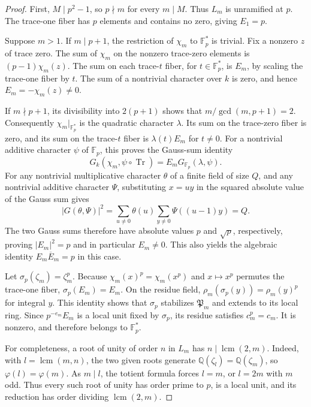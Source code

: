 \documentclass[11pt]{article}
\newcommand{\Q}{\mathbb Q}
\newcommand{\F}{\mathbb F}
\theoremstyle{definition}
\theoremstyle{remark}
\begin{document}
\begin{proof}
First, $M\mid p^2-1$, so $p\nmid m$ for every $m\mid M$.
Thus $L_m$ is unramified at $p$.  The trace-one fiber has $p$
elements and contains no zero, giving $E_1=p$.

Suppose $m>1$.  If $m\mid p+1$, the restriction of $\chi_m$ to
$\F_p^*$ is trivial.  Fix a nonzero $z$ of trace zero.  The sum
of $\chi_m$ on the nonzero trace-zero elements is
$(p-1)\chi_m(z)$.  The sum on each trace-$t$ fiber, for
$t\in\F_p^*$, is $E_m$, by scaling the trace-one fiber by $t$.
The sum of a nontrivial character over $k$ is zero, and hence
$E_m=-\chi_m(z)\ne0$.

If $m\nmid p+1$, its divisibility into $2(p+1)$ shows that
$m/\gcd(m,p+1)=2$.  Consequently $\chi_m|_{\F_p^*}$ is the
quadratic character $\lambda$.  Its sum on the trace-zero fiber is
zero, and its sum on the trace-$t$ fiber is $\lambda(t)E_m$
for $t\ne0$.  For a nontrivial additive character $\psi$ of
$\F_p$, this proves the Gauss-sum identity
\[
 G_k(\chi_m,\psi\circ\operatorname{Tr})
       =E_m G_{\F_p}(\lambda,\psi).
\]
For any nontrivial multiplicative character $\theta$ of a finite
field of size $Q$, and any nontrivial additive character $\Psi$,
substituting $x=uy$ in the squared absolute value of the Gauss
sum gives
\[
 |G(\theta,\Psi)|^2
 =\sum_{u\ne0}\theta(u)
       \sum_{y\ne0}\Psi((u-1)y)=Q.
\]
The two Gauss sums therefore have absolute values $p$ and
$\sqrt p$, respectively, proving $|E_m|^2=p$ and in particular
$E_m\ne0$.  This also yields the algebraic identity
$E_m\overline E_m=p$ in this case.

Let $\sigma_p(\zeta_m)=\zeta_m^p$.  Because
$\chi_m(x)^p=\chi_m(x^p)$ and $x\mapsto x^p$ permutes the
trace-one fiber, $\sigma_p(E_m)=E_m$.  On the residue field,
$\rho_m(\sigma_p(y))=\rho_m(y)^p$ for integral $y$.
This identity shows that $\sigma_p$ stabilizes $\mathfrak P_m$
and extends to its local ring.  Since $p^{-e_m}E_m$ is a local
unit fixed by $\sigma_p$, its residue satisfies $c_m^p=c_m$.
It is nonzero, and therefore belongs to $\F_p^*$.

For completeness, a root of unity of order $n$ in $L_m$ has
$n\mid\operatorname{lcm}(2,m)$.  Indeed, with
$l=\operatorname{lcm}(m,n)$, the two given roots generate
$\Q(\zeta_l)=\Q(\zeta_m)$, so $\varphi(l)=\varphi(m)$.
As $m\mid l$, the totient formula forces $l=m$, or $l=2m$
with $m$ odd.  Thus every such root of unity has order prime
to $p$, is a local unit, and its reduction has order dividing
$\operatorname{lcm}(2,m)$.


\end{proof}
\end{document}
